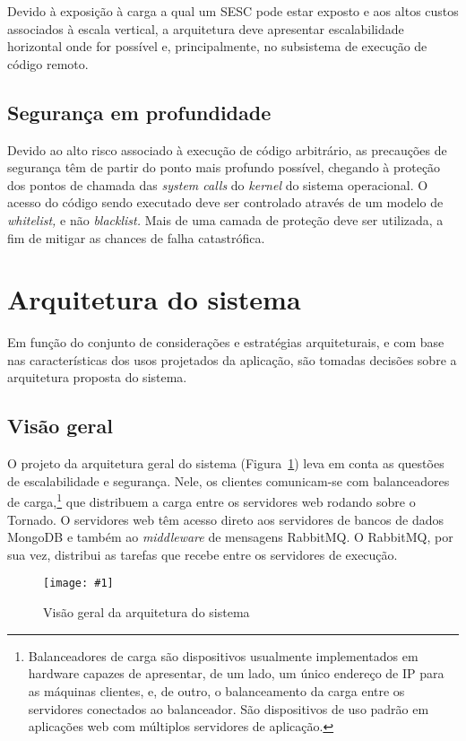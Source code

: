 \documentclass[ruledheader, 12pt]{abnt}
\newcommand{\figcustom}[4]{\par
	\begin{figure}[#3]
		\centering
		\texttt{[image: \#1]}
		\caption{\label{fig:#1}#2}
	\end{figure}
\par}
\newcommand{\figref}[1]{(Figura~\ref{fig:#1})}
\begin{document}
Devido à exposição à carga a qual um SESC pode estar exposto e aos altos custos associados à escala vertical, a arquitetura deve apresentar escalabilidade horizontal onde for possível e, principalmente, no subsistema de execução de código remoto.

\subsection{Segurança em profundidade}

Devido ao alto risco associado à execução de código arbitrário, as precauções de segurança têm de partir do ponto mais profundo possível, chegando à proteção dos pontos de chamada das \emph{system calls} do \emph{kernel} do sistema operacional. O acesso do código sendo executado deve ser controlado através de um modelo de \emph{whitelist,} e não \emph{blacklist.} Mais de uma camada de proteção deve ser utilizada, a fim de mitigar as chances de falha catastrófica.

\section{Arquitetura do sistema}

Em função do conjunto de considerações e estratégias arquiteturais, e com base nas características dos usos projetados da aplicação, são tomadas decisões sobre a arquitetura proposta do sistema.

\subsection{Visão geral}

O projeto da arquitetura geral do sistema \figref{architecture} leva em conta as questões de escalabilidade e segurança. Nele, os clientes comunicam-se com balanceadores de carga,\footnote{Balanceadores de carga são dispositivos usualmente implementados em hardware capazes de apresentar, de um lado, um único endereço de IP para as máquinas clientes, e, de outro, o balanceamento da carga entre os servidores conectados ao balanceador. São dispositivos de uso padrão em aplicações web com múltiplos servidores de aplicação.} que distribuem a carga entre os servidores web rodando sobre o Tornado. O servidores web têm acesso direto aos servidores de bancos de dados MongoDB e também ao \emph{middleware} de mensagens RabbitMQ. O RabbitMQ, por sua vez, distribui as tarefas que recebe entre os servidores de execução.

\afterpage{\clearpage}
\figcustom{architecture}{Visão geral da arquitetura do sistema}{bp}{.9}
\end{document}
